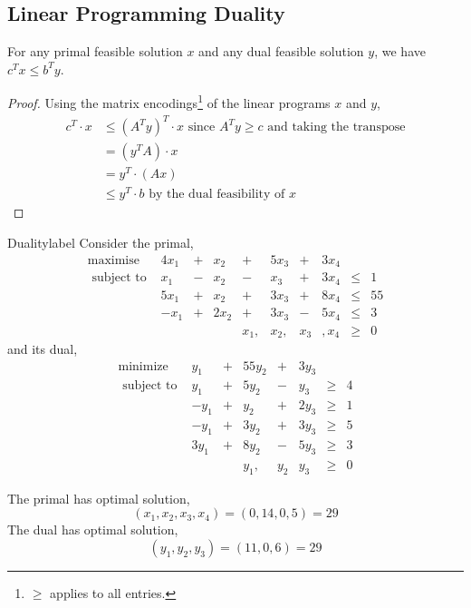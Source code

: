 	\subsection{Linear Programming Duality}
	\begin{thm}
		For any primal feasible solution $x$ and any dual feasible solution $y$, we have $c^Tx \leq b^Ty$.
	\end{thm}

	\begin{proof}
		Using the matrix encodings\footnote{$\geq$ applies to all entries.} of the linear programs $x$ and $y$,
		\begin{align*}
			c^T \cdot x &\leq (A^Ty)^T \cdot x \text{ since $A^{T}y \geq c$ and taking the transpose}\\
					 &= (y^TA) \cdot x \\
					 &= y^T \cdot (Ax) \\
					 &\leq y^T \cdot b \text{ by the dual feasibility of $x$}
		\end{align*}
	\end{proof}

	\begin{ex}{Duality}{label}
		Consider the primal,
		\[
			\begin{array}{cccccccccc}
			\operatorname{maximise} & 4x_{1} & + & x_{2} & + & 5x_{3} & + & 3x_{4} & & \\
			\text { subject to } & x_{1} & - & x_{2} & - & x_{3} & + & 3 x_{4} & \leq & 1
			\\ & 5 x_{1} & + & x_{2} & + & 3 x_{3} & + & 8 x_{4} & \leq & 55
			\\ & -x_{1} & + & 2 x_{2} & + & 3 x_{3} & - & 5 x_{4} & \leq & 3
			\\ & & & & x_{1}, & x_{2}, & x_{3} & , x_{4} & \geq & 0
			\end{array}
		\]
		\noindent and its dual,
		\[
		\begin{array}{ccccccccc}
		\operatorname{minimize} & y_{1} & + & 55 y_{2} & + & 3 y_{3} & &
		\\ \text { subject to } & y_{1} & + & 5 y_{2} & - & y_{3} & \geq & 4
		\\ & -y_{1} & + & y_{2} & + & 2 y_{3} & \geq & 1 \\
		& -y_{1} & + & 3 y_{2} & + & 3 y_{3} & \geq & 5
		\\ & 3 y_{1} & + & 8 y_{2} & - & 5 y_{3} & \geq & 3
		\\ & & & y_{1}, & y_{2} & y_{3} & \geq & 0
		\end{array}
		\]

		\noindent The primal has optimal solution,
		\[(x_1, x_2, x_3, x_4) = (0, 14, 0, 5) = 29\]
		\noindent The dual has optimal solution,
		\[(y_1, y_2, y_3) = (11,0,6) = 29\]
	\end{ex}

